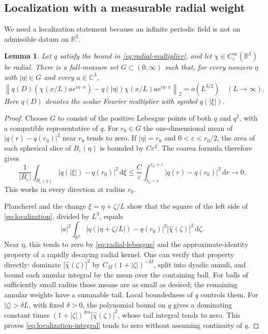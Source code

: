 \documentclass[11pt]{article}
\newtheorem{lemma}[theorem]{Lemma}
\theoremstyle{remark}
\newcommand{\R}{\mathbb R}
\newcommand{\C}{\mathbb C}
\newcommand{\norm}[1]{\left\lVert#1\right\rVert}
\newcommand{\dd}{\,\mathrm d}
\begin{document}
\subsection{Localization with a measurable radial weight}
We need a localization statement because an infinite periodic field is not
an admissible datum on $\R^3$.

\begin{lemma}\label{lem:localization}
Let $q$ satisfy the bound in \eqref{eq:radial-multiplier}, and let
$\chi\in C_c^\infty(\R^3)$ be radial. There is a full-measure set
$G\subset(0,\infty)$ such that, for every nonzero $\eta$ with $|\eta|\in G$
and every $a\in\C^3$,
\begin{equation}
 \norm{q(D)(\chi(x/L)a e^{i\eta\cdot x})
      -q(|\eta|)\chi(x/L)a e^{i\eta\cdot x}}_2=o(L^{3/2})
 \quad(L\to\infty).
 \label{eq:localization}
\end{equation}
Here $q(D)$ denotes the scalar Fourier multiplier with symbol $q(|\xi|)$.
\end{lemma}
\begin{proof}
Choose $G$ to consist of the positive Lebesgue points of both $q$ and
$q^2$, with a compatible representative of $q$. For $r_0\in G$ the
one-dimensional mean of $|q(r)-q(r_0)|^2$ near $r_0$ tends to zero.
If $|\eta|=r_0$ and $0<\varepsilon<r_0/2$, the area of each spherical
slice of $B_\varepsilon(\eta)$ is bounded by $C\varepsilon^2$.
The coarea formula therefore gives
\begin{equation}
 \frac{1}{|B_\varepsilon|}
 \int_{B_\varepsilon(\eta)}|q(|\xi|)-q(r_0)|^2\dd\xi
 \le\frac{C}{\varepsilon}
       \int_{r_0-\varepsilon}^{r_0+\varepsilon}
                       |q(r)-q(r_0)|^2\dd r\longrightarrow0.
 \label{eq:radial-lebesgue}
\end{equation}
This works in every direction at radius $r_0$.

Plancherel and the change $\xi=\eta+\zeta/L$ show that the square of the
left side of \eqref{eq:localization}, divided by $L^3$, equals
\begin{equation}
 |a|^2\int_{\R^3}|q(|\eta+\zeta/L|)-q(r_0)|^2
                              |\widehat\chi(\zeta)|^2\dd\zeta.
 \label{eq:localization-integral}
\end{equation}
Near $\eta$, this tends to zero by \eqref{eq:radial-lebesgue} and the
approximate-identity property of a rapidly decaying radial kernel.
One can verify that property directly: dominate $|\widehat\chi(\zeta)|^2$
by $C_M(1+|\zeta|)^{-M}$, split into dyadic annuli, and bound each annular
integral by the mean over the containing ball. For balls of sufficiently
small radius those means are as small as desired; the remaining annular
weights have a summable tail. Local boundedness of $q$ controls them.
For $|\zeta|>\delta L$, with fixed $\delta>0$, the polynomial bound on $q$
gives a dominating constant times
$(1+|\zeta|)^{4m}|\widehat\chi(\zeta)|^2$, whose tail integral tends to
zero. This proves \eqref{eq:localization-integral} tends to zero without
assuming continuity of $q$.
\end{proof}
\end{document}
